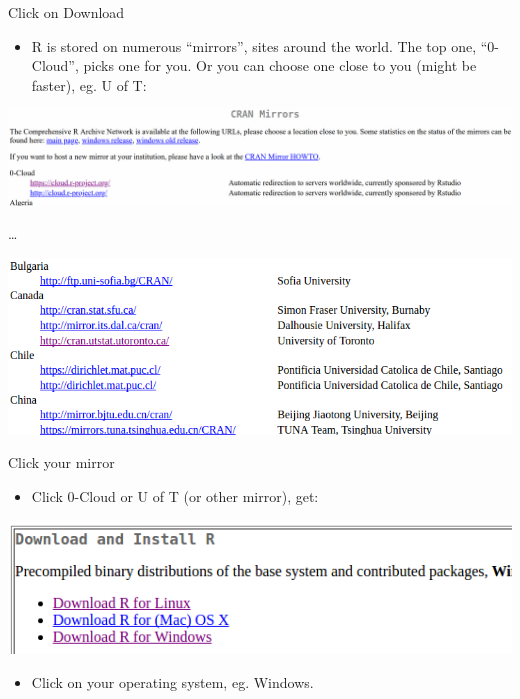 \documentclass[
  ignorenonframetext,
]{beamer}
\providecommand{\tightlist}{%
  \setlength{\itemsep}{0pt}\setlength{\parskip}{0pt}}
\begin{document}
\begin{frame}{Click on Download}
\protect\hypertarget{click-on-download}{}

\begin{itemize}
\tightlist
\item
  R is stored on numerous ``mirrors'', sites around the world. The top
  one, ``0-Cloud'', picks one for you. Or you can choose one close to
  you (might be faster), eg. U of T:
\end{itemize}

\includegraphics{Screenshot_2018-08-17_11-09-02.png}

\ldots{}

\includegraphics{r39.png}

\end{frame}

\begin{frame}{Click your mirror}
\protect\hypertarget{click-your-mirror}{}

\begin{itemize}
\tightlist
\item
  Click 0-Cloud or U of T (or other mirror), get:
\end{itemize}

\includegraphics{r32.png}

\begin{itemize}
\tightlist
\item
  Click on your operating system, eg. Windows.
\end{itemize}

\end{frame}
\end{document}
